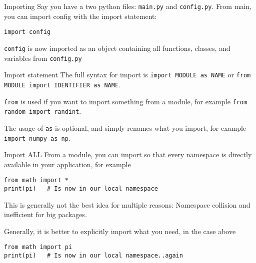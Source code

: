 \begin{frame}[containsverbatim]{Importing}
  Say you have a two python files: \verb|main.py| and \verb|config.py|. From main, you can import config with the import statement:

  \begin{verbatim}
import config
  \end{verbatim}

  \verb|config| is now imported as an object containing all functions, classes, and variables from \verb|config.py|
\end{frame}

\begin{frame}[containsverbatim]{Import statement}
  The full syntax for import is \texttt{import MODULE as NAME} or \texttt{from MODULE import IDENTIFIER as NAME}.

  \verb|from| is used if you want to import something from a module, for example \texttt{from random import randint}.

  The usage of \verb|as| is optional, and simply renames what you import, for example \texttt{import numpy as np}.
\end{frame}

\begin{frame}[containsverbatim]{Import ALL}
  From a module, you can import so that every namespace is directly available in your application, for example

  \begin{verbatim}
from math import *
print(pi)   # Is now in our local namespace
  \end{verbatim}

  This is generally not the best idea for multiple reasons: Namespace collision and inefficient for big packages.

  Generally, it is better to explicitly import what you need, in the case above
    \begin{verbatim}
from math import pi
print(pi)   # Is now in our local namespace..again
  \end{verbatim}
\end{frame}

